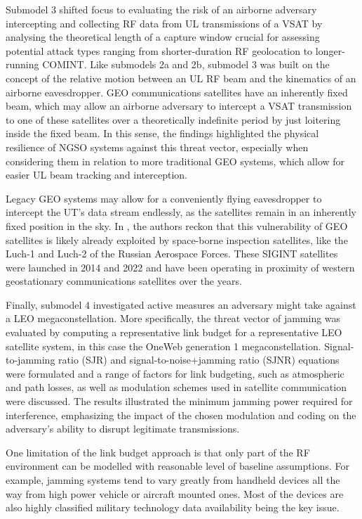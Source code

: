 \documentclass[english, 12pt, a4paper, elec, utf8, a-1b, online]{aaltothesis}
\begin{document}
Submodel 3 shifted focus to evaluating the risk of an airborne adversary intercepting and collecting RF data from UL transmissions of a VSAT by analysing the theoretical length of a capture window crucial for assessing potential attack types ranging from shorter-duration RF geolocation to longer-running COMINT.
Like submodels 2a and 2b, submodel 3 was built on the concept of the relative motion between an UL RF beam and the kinematics of an airborne eavesdropper. GEO communications satellites have an inherently fixed beam, which may allow an airborne adversary to intercept a VSAT transmission to one of these satellites over a theoretically indefinite period by just loitering inside the fixed beam.
In this sense, the findings highlighted the physical resilience of NGSO systems against this threat vector, especially when considering them in relation to more traditional GEO systems, which allow for easier UL beam tracking and interception.

Legacy GEO systems may allow for a conveniently flying eavesdropper to intercept the UT's data stream endlessly, as the satellites remain in an inherently fixed position in the sky.
In \cite{bingen2023space}, the authors reckon that this vulnerability of GEO satellites is likely already exploited by space-borne inspection satellites, like the Luch-1 and Luch-2 of the Russian Aerospace Forces.
These SIGINT satellites were launched in 2014 and 2022 and have been operating in proximity of western geostationary communications satellites over the years.

Finally, submodel 4 investigated active measures an adversary might take against a LEO megaconstellation. More specifically, the threat vector of jamming was evaluated by computing a representative link budget for a representative LEO satellite system, in this case the OneWeb generation 1 megaconstellation.
Signal-to-jamming ratio (SJR) and signal-to-noise+jamming ratio (SJNR) equations were formulated and a range of factors for link budgeting, such as atmospheric and path losses, as well as modulation schemes used in satellite communication were discussed.
The results illustrated the minimum jamming power required for interference, emphasizing the impact of the chosen modulation and coding on the adversary's ability to disrupt legitimate transmissions. 

One limitation of the link budget approach is that only part of the RF environment can be modelled with reasonable level of baseline assumptions. For example, jamming systems tend to vary greatly from handheld devices all the way from high power vehicle or aircraft mounted ones. Most of the devices are also highly classified military technology data availability being the key issue.
\end{document}
